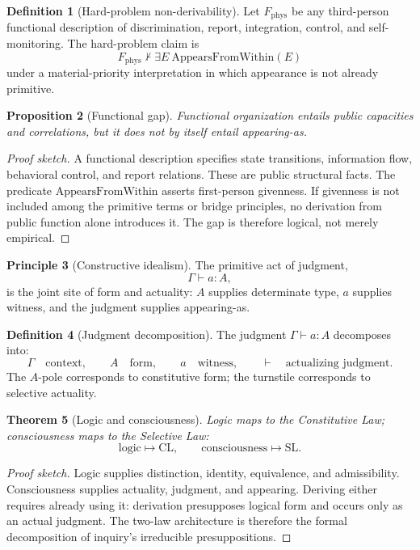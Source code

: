 \documentclass[11pt]{article}
\theoremstyle{plain}
\newtheorem{theorem}{Theorem}[section]
\newtheorem{proposition}[theorem]{Proposition}
\theoremstyle{definition}
\newtheorem{definition}[theorem]{Definition}
\newtheorem{principle}[theorem]{Principle}
\theoremstyle{remark}
\newenvironment{proofsketch}{\begin{proof}[Proof sketch]}{\end{proof}}
\newcommand{\CL}{\mathrm{CL}}
\newcommand{\SLaw}{\mathrm{SL}}
\begin{document}
\begin{definition}[Hard-problem non-derivability]
Let \(F_{\mathrm{phys}}\) be any third-person functional description of discrimination, report, integration, control, and self-monitoring. The hard-problem claim is
\[
F_{\mathrm{phys}}\not\vdash \exists E\ \mathrm{AppearsFromWithin}(E)
\]
under a material-priority interpretation in which appearance is not already primitive.
\end{definition}

\begin{proposition}[Functional gap]
Functional organization entails public capacities and correlations, but it does not by itself entail appearing-as.
\end{proposition}

\begin{proofsketch}
A functional description specifies state transitions, information flow, behavioral control, and report relations. These are public structural facts. The predicate \(\mathrm{AppearsFromWithin}\) asserts first-person givenness. If givenness is not included among the primitive terms or bridge principles, no derivation from public function alone introduces it. The gap is therefore logical, not merely empirical.
\end{proofsketch}

\begin{principle}[Constructive idealism]
The primitive act of judgment,
\[
\Gamma\vdash a:A,
\]
is the joint site of form and actuality: \(A\) supplies determinate type, \(a\) supplies witness, and the judgment supplies appearing-as.
\end{principle}

\begin{definition}[Judgment decomposition]
The judgment \(\Gamma\vdash a:A\) decomposes into:
\[
\Gamma \quad\text{context},\qquad
A \quad\text{form},\qquad
a \quad\text{witness},\qquad
\vdash \quad\text{actualizing judgment}.
\]
The \(A\)-pole corresponds to constitutive form; the turnstile corresponds to selective actuality.
\end{definition}

\begin{theorem}[Logic and consciousness]
Logic maps to the Constitutive Law; consciousness maps to the Selective Law:
\[
\text{logic}\mapsto\CL,
\qquad
\text{consciousness}\mapsto\SLaw.
\]
\end{theorem}

\begin{proofsketch}
Logic supplies distinction, identity, equivalence, and admissibility. Consciousness supplies actuality, judgment, and appearing. Deriving either requires already using it: derivation presupposes logical form and occurs only as an actual judgment. The two-law architecture is therefore the formal decomposition of inquiry's irreducible presuppositions.
\end{proofsketch}
\end{document}
